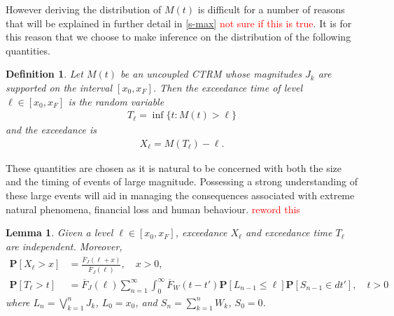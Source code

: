 \documentclass[honours,12pt]{UNSWthesis}
\newcommand{\pr}{\mathbf {P}}
\newcommand{\1}{\mathbf 1}
\newtheorem{lemma}[theorem]{Lemma}
\newtheorem{definition}[theorem]{Definition}
\numberwithin{equation}{section}
\theoremstyle{definition}
\theoremstyle{remark}
\begin{document}
However deriving the distribution of $M(t)$ is difficult for a number of reasons that will be explained in further detail in \ref{s-max} \textcolor{red}{not sure if this is true}. It is for this reason that we choose to make inference on the distribution of the following quantities.\\
\begin{definition}
Let $M(t)$ be an uncoupled CTRM whose magnitudes $J_k$ are supported on the interval
$[x_0, x_F]$.  Then the exceedance time of level $\ell \in [x_0,x_F]$ is
the random variable
\begin{align*}
T_\ell = \inf\{t: M(t) > \ell\}
\end{align*}
and the exceedance is 
\begin{align*}
X_\ell = M(T_\ell) - \ell.
\end{align*}
\end{definition}
These quantities are chosen as it is natural to be concerned with both the size and the timing of events of large magnitude. Possessing a strong understanding of these large events will aid in managing the consequences associated with extreme natural phenomena, financial loss and human behaviour. \textcolor{red}{reword this}
\begin{lemma}
Given a level $\ell \in [x_0,x_F]$, exceedance $X_\ell$ and exceedance time
$T_\ell$ are independent. Moreover, 
\begin{align*}
\pr[X_\ell > x]
&= \frac{\overline F_J(\ell + x)}{\overline F_J(\ell)}, \quad x > 0,
\\
\pr[T_\ell > t]
&= \overline F_J(\ell) \sum_{n=1}^\infty \int_0^\infty \overline F_W(t-t') \pr[L_{n-1} \le \ell]
\pr[S_{n-1} \in dt'], \quad t > 0
\end{align*}
where $L_n = \bigvee_{k=1}^n J_k$, $L_0 = x_0$, and $S_n = \sum_{k=1}^n W_k$,
$S_0 = 0$.
\end{lemma}
\end{document}
